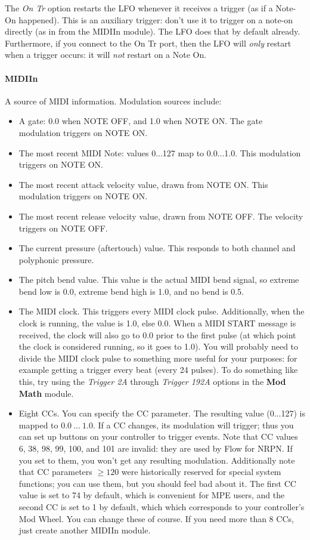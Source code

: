 \documentclass{article}
\newcommand\name{Flow}
\begin{document}
The {\it On Tr} option restarts the LFO whenever it receives a trigger (as if a Note-On happened).  This is an auxiliary trigger: don't use it to trigger on a note-on directly (as in from the MIDIIn module).  The LFO does that by default already.  Furthermore, if you connect to the On Tr port, then the LFO will {\it only} restart when a trigger occurs: it will {\it not} restart on a Note On.

\paragraph{MIDIIn}  A source of MIDI information.  Modulation sources include:

\begin{itemize}
\item A gate: 0.0 when NOTE OFF, and 1.0 when NOTE ON.  The gate modulation triggers on NOTE ON.
\item The most recent MIDI Note: values 0...127 map to 0.0...1.0.  This modulation triggers on NOTE ON.
\item The most recent attack velocity value, drawn from NOTE ON. This modulation triggers on NOTE ON.
\item The most recent release velocity value, drawn from NOTE OFF.  The velocity triggers on NOTE OFF.
\item The current pressure (aftertouch) value.  This responds to both channel and polyphonic pressure.
\item The pitch bend value.  This value is the actual MIDI bend signal, so extreme bend low is 0.0, extreme bend high is 1.0, and no bend is 0.5.
\item The MIDI clock.  This triggers every MIDI clock pulse.  Additionally, when the clock is running, the value is 1.0, else 0.0.  When a MIDI START message is received, the clock will also go to 0.0 prior to the first pulse (at which point the clock is considered running, so it goes to 1.0).  You will probably need to divide the MIDI clock pulse to something more useful for your purposes: for example getting a trigger every beat (every 24 pulses).  To do something like this, try using the {\it Trigger 2A} through {\it Trigger 192A} options in the {\bf Mod Math} module.
\item Eight CCs.  You can specify the CC parameter.  The resulting value (0...127) is mapped to \(0.0\ ...\ 1.0\).  If a CC changes, its modulation will trigger; thus you can set up buttons on your controller to trigger events. Note that CC values 6, 38, 98, 99, 100, and 101 are invalid: they are used by {\name} for NRPN.  If you set to them, you won't get any resulting modulation.  Additionally note that CC parameters \(\geq 120\) were historically reserved for special system functions; you can use them, but you should feel bad about it.   The first CC value is set to 74 by default, which is convenient for MPE users, and the second CC is set to 1 by default, which which corresponds to your controller's Mod Wheel.  You can change these of course.  If you need more than 8 CCs, just create another MIDIIn module.
\end{itemize}
\end{document}
